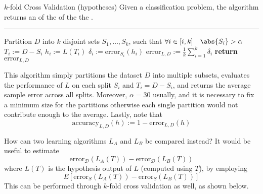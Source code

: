 \documentclass[a4paper, 12pt]{report}
\begin{document}
    \begin{framedalgo}[label={k-fold1}]{$k$-fold Cross Validation (hypotheses)}
        Given a classification problem, the algorithm returns an  of the  of the the . \\
        \hrule
        \quad
        \begin{algorithmic}[1]
                \State Partition $D$ into $k$ disjoint sets $S_1, \ldots , S_k$, such that $\forall i \in [i, k] \quad \abs{S_i} > \alpha$
                    \State $T_i := D - S_i$ 
                    \State $h_i := L(T_i)$
                    \State $\delta_i := \mathrm{error}_{S_i}(h_i)$
                \EndFor
                \State $\mathrm{error}_{L, D} := \frac{1}{k} \sum_{i = 1}^k{\delta_i}$
                \State \textbf{return} $\mathrm{error}_{L, D}$
            \EndFunction
        \end{algorithmic}
    \end{framedalgo}

    This algorithm simply partitions the dataset $D$ into multiple subsets, evaluates the performance of $L$ on each split $S_i$ and $T_i = D - S_i$, and returns the average sample error across all splits. Moreover, $\alpha = 30$ usually, and it is necessary to fix a minimum size for the partitions otherwise each single partition would not contribute enough to the average. Lastly, note that $$\mathrm{accuracy}_{L, D}(h) := 1 - \mathrm{error}_{L, D}(h)$$

    How can two learning algorithms $L_A$ and $L_B$ be compared instead? It would be useful to estimate $$\mathrm{error}_\mathcal D (L_A(T)) - \mathrm{error}_\mathcal D(L_B(T))$$ where $L(T)$ is the hypothesis output of $L$ (computed using $T$), by employing $$E[\mathrm{error}_S(L_A(T)) - \mathrm{error}_S(L_B(T))]$$ This can be performed through $k$-fold cross validation as well, as shown below.
\end{document}
